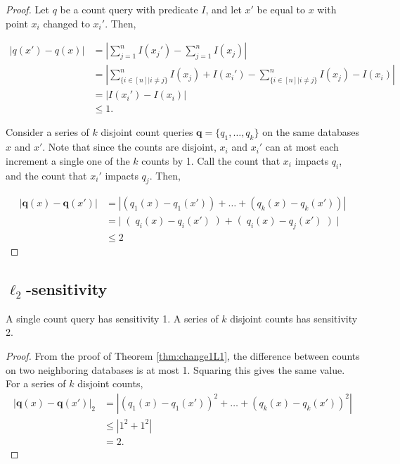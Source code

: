 \documentclass[11pt]{scrartcl} %
\begin{document}
\begin{proof}
Let $q$ be a count query with predicate $I$, and let $x'$ be equal to $x$ with point $x_i$ changed to $x_i'$. Then,

\begin{align*}
\left\vert q(x') - q(x) \right\vert &= \left\vert \sum_{j=1}^n I(x_j') - \sum_{j=1}^n I(x_j) \right\vert \\
	&= \left\vert \sum_{\{ i \in [n] \vert i \ne j\}}^n I(x_j) + I(x_i') - \sum_{\{ i \in [n] \vert i \ne j\}}^n I(x_j) - I(x_i) \right\vert \\
	&= \left\vert I(x_i') - I(x_i) \right\vert \\
	& \le 1.
\end{align*}

Consider a series of $k$ disjoint count queries $\mathbf{q} = \{q_1, \ldots, q_k\}$ on the same databases $x$ and $x'$. Note that since the counts are disjoint, $x_i$ and $x_i'$ can at most each increment a single one of the $k$ counts by 1. Call the count that $x_i$ impacts $q_i$, and the count that $x_i'$ impacts $q_j$. Then,

\begin{align*}
\left\vert \mathbf{q}(x) - \mathbf{q}(x') \right\vert &= \left\vert \left(q_1(x) - q_1(x')\right) + \ldots + \left(q_k(x) - q_k(x')\right) \right\vert \\
	&= \left\vert \right(q_i(x) - q_i(x')\left) + \right(q_i(x) - q_j(x')\left) \right\vert \\
	&\le 2
\end{align*}
\end{proof}

\subsection{$\ell_2$-sensitivity}

\begin{theorem}
A single count query has sensitivity 1. A series of $k$ disjoint counts has sensitivity 2.
\end{theorem}

\begin{proof}
From the proof of Theorem \ref{thm:change1L1}, the difference between counts on two neighboring databases is at most 1. Squaring this gives the same value. For a series of $k$ disjoint counts,
\begin{align*}
\left\vert \mathbf{q}(x) - \mathbf{q}(x') \right\vert_2 &= \left\vert \left(q_1(x) - q_1(x')\right)^2 + \ldots + \left(q_k(x) - q_k(x')\right)^2 \right\vert \\
 & \le \left\vert 1^2 + 1^2 \right\vert \\
 &= 2.
 \end{align*}
\end{proof}
\end{document}
